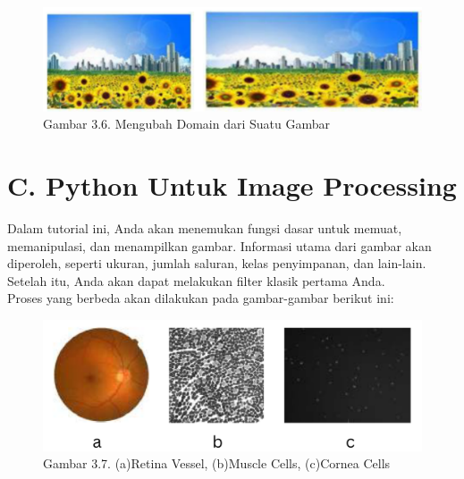 \documentclass[
  letterpaper,
  DIV=11,
  numbers=noendperiod]{scrreprt}
\begin{document}
\begin{figure}

{\centering \includegraphics{Asset/image1114.png}

}

\caption{Gambar 3.6. Mengubah Domain dari Suatu Gambar}

\end{figure}

\hypertarget{c.-python-untuk-image-processing}{%
\section*{C. Python Untuk Image
Processing}\label{c.-python-untuk-image-processing}}


Dalam tutorial ini, Anda akan menemukan fungsi dasar untuk memuat,
memanipulasi, dan menampilkan gambar. Informasi utama dari gambar akan
diperoleh, seperti ukuran, jumlah saluran, kelas penyimpanan, dan
lain-lain. Setelah itu, Anda akan dapat melakukan filter klasik pertama
Anda.\\
Proses yang berbeda akan dilakukan pada gambar-gambar berikut ini:

\begin{figure}

{\centering \includegraphics{Asset/image1115.png}

}

\caption{Gambar 3.7. (a)Retina Vessel, (b)Muscle Cells, (c)Cornea Cells}

\end{figure}
\end{document}
